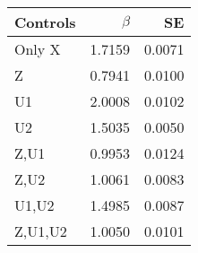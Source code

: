 \begin{tabular}{lrr}
\toprule
Controls & $\beta$ & SE\\
\midrule
Only X & 1.7159 & 0.0071 \\
{Z} & 0.7941 & 0.0100 \\
{U1} & 2.0008 & 0.0102 \\
{U2} & 1.5035 & 0.0050 \\
{Z,U1} & 0.9953 & 0.0124 \\
{Z,U2} & 1.0061 & 0.0083 \\
{U1,U2} & 1.4985 & 0.0087 \\
{Z,U1,U2} & 1.0050 & 0.0101 \\
\bottomrule
\end{tabular}
